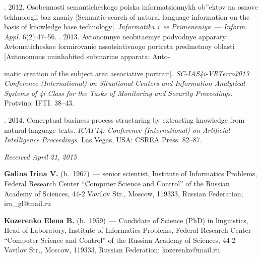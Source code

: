 \begin{multicols}{2}
{{\begin{thebibliography}{99}
. 2012. Osobennosti
semanticheskogo poiska informatsionnykh  ob''ektov na osnove tekhnologii baz
znaniy [Semantic search of natural language information on the basis of
knowledge base technology]. \textit{Informatika i~ee Primeneniya}~---
\textit{Inform. Appl.} 6(2):47--56.
. 2013. Avtonomnye neobitaemye podvodnye apparaty:
Avtomaticheskoe formirovanie assotsiativnogo portreta predmetnoy oblasti
[Autonomous uninhabited submarine apparata: Auto-\linebreak\vspace*{-12pt}

 \pagebreak

 \noindent
 matic creation of the subject
area associative portrait].
 \textit{SC-IAS4i-VRTerro2013 Conference
(International) on Situational Centers and Information Analytical Systems of 4i
Class for the Tasks of Monitoring and Security Proceedings}. Protvino: IFTI.
38--43.

. 2014. Conceptual
business process structuring by extracting knowledge from natural language texts.
\textit{ICAI'14: Conference (International) on Artificial Intelligence
Proceedings}. Las Vegas, USA: CSREA Press. 82--87.
\end{thebibliography}

 }
 }

\end{multicols}

\vspace*{-3pt}

\hfill{\small\textit{Received April 21, 2015}}




    \Contr

    \noindent
   \textbf{Galina Irina V.} (b.\ 1967)~--- senior scientist, Institute of
Informatics Problems, Federal Research Center ``Computer Science
and Control'' of the Russian Academy of Sciences, 44-2 Vavilov
Str., Moscow, 119333, Russian Federation; irn\_gl@mail.ru

   \vspace*{3pt}

   \noindent
   \textbf{Kozerenko Elena B.} (b.\ 1959)~---
   Candidate of Science (PhD) in linguistics, Head of Laboratory,
Institute of Informatics Problems, Federal Research Center
``Computer Science and Control'' of the Russian Academy of
Sciences, 44-2 Vavilov Str., Moscow, 119333, Russian Federation;
kozerenko@mail.ru

